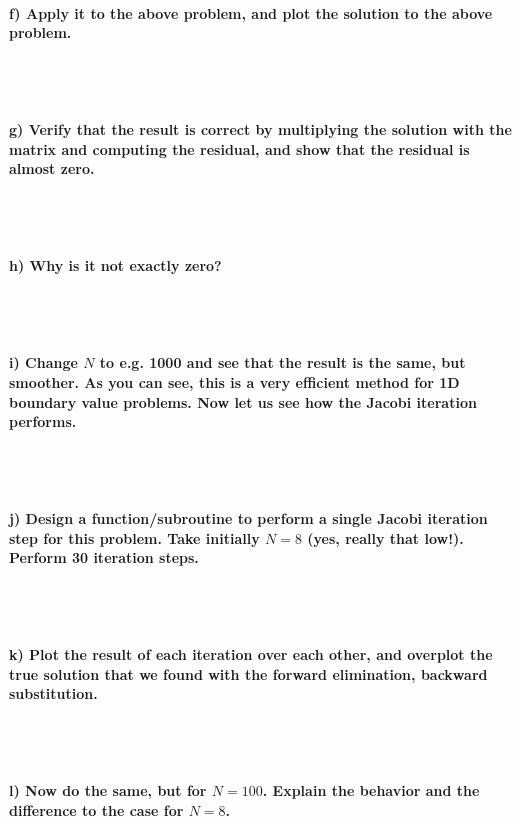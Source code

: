 \paragraph{
    f) Apply it to the above problem, and plot the solution to the 
    above problem.
} \ \\
    \\

\paragraph{
    g) Verify that the result is correct by multiplying the solution 
    with the matrix and computing the residual, and show that the 
    residual is almost zero.
} \ \\
    \\

\paragraph{
    h) Why is it not exactly zero?
} \ \\
    \\

\paragraph{
    i) Change $N$ to e.g. 1000 and see that the result is the same, but 
    smoother. As you can see, this is a very efficient method for 1D 
    boundary value problems. Now let us see how the Jacobi iteration 
    performs.
} \ \\
    \\

\paragraph{
    j) Design a function/subroutine to perform a single Jacobi iteration 
    step for this problem. Take initially $N=8$ (yes, really that low!). 
    Perform 30 iteration steps.
} \ \\
    \\

\paragraph{
    k) Plot the result of each iteration over each other, and overplot 
    the true solution that we found with the forward elimination, 
    backward substitution.
} \ \\
    \\

\paragraph{
    l) Now do the same, but for $N=100$. Explain the behavior and the 
    difference to the case for $N=8$.
}
